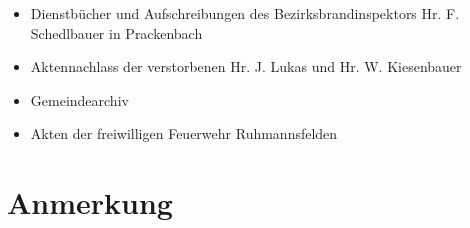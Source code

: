 \documentclass[12pt,a4paper]{book}
\begin{document}
\begin{itemize}
\item Dienstbücher und Aufschreibungen des Bezirksbrandinspektors Hr. F.
Schedlbauer in Prackenbach

\item Aktennachlass der verstorbenen Hr. J. Lukas und Hr. W. Kiesenbauer

\item Gemeindearchiv

\item Akten der freiwilligen Feuerwehr Ruhmannsfelden
\end{itemize}

\chapter{Anmerkung}
\end{document}
